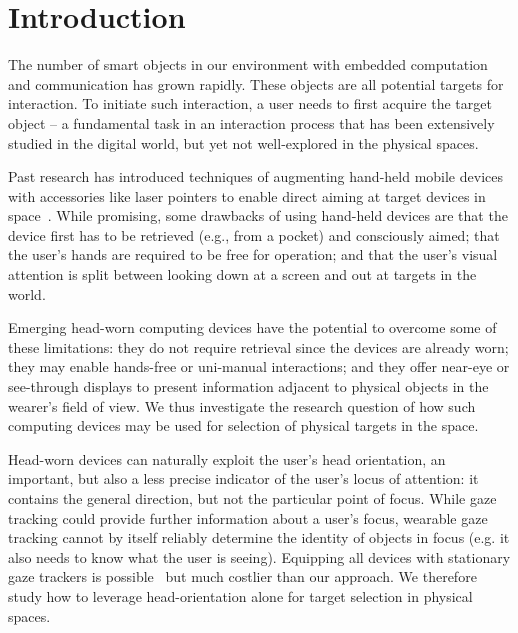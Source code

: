 \section{Introduction}

The number of smart objects in our environment with embedded computation and communication has grown rapidly. These objects are all potential targets for interaction. To initiate such interaction, a user needs to first acquire the target object -- a fundamental task in an interaction process that has been extensively studied in the digital world, but yet not well-explored in the physical spaces.


Past research has introduced techniques of augmenting hand-held mobile devices with accessories like laser pointers to enable direct aiming at target devices in space~\cite{beigl_point_1999,patel_2-way_2003}. While promising, some drawbacks of using hand-held devices are that the device first has to be retrieved (e.g., from a pocket) and consciously aimed; that the user's hands are required to be free for operation; and that the user's visual attention is split between looking down at a screen and out at targets in the world. 

Emerging head-worn computing devices have the potential to overcome some of these limitations: they do not require retrieval since the devices are already worn; they may enable hands-free or uni-manual interactions; and they offer near-eye or see-through displays to present information adjacent to physical objects in the wearer's field of view. We thus investigate the research question of how such computing devices may be used for selection of physical targets in the space.

Head-worn devices can naturally exploit the user's head orientation, an important, but also a less precise indicator of the user's locus of attention: it contains the general direction, but not the particular point of focus. While gaze tracking could provide further information about a user's focus, wearable gaze tracking cannot by itself reliably determine the identity of objects in focus (e.g. it also needs to know what the user is seeing). Equipping all devices with stationary gaze trackers is possible~\cite{vertegaal2005media} but much costlier than our approach. We therefore study how to leverage head-orientation alone for target selection in physical spaces. 

